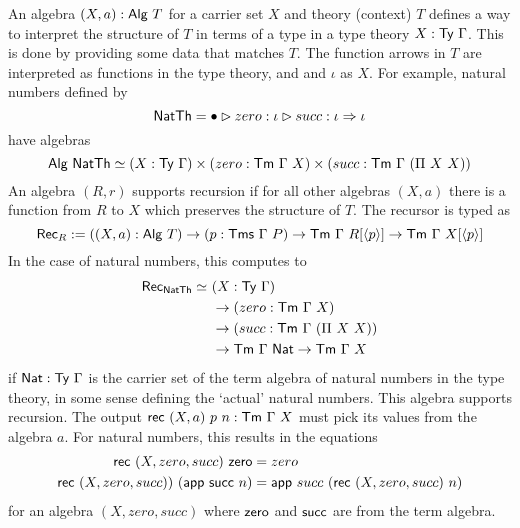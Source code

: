 An algebra $(X, a) : \textsf{Alg}\ T$ for a carrier set $X$ and theory (context)
$T$ defines a way to interpret the structure of $T$ in terms of a type in a type theory
$X : \textsf{Ty}\ \Gamma$. This is done by providing some data that matches $T$. The
function arrows in $T$ are interpreted as functions in the type theory, and
and $\iota$ as $X$. For example, natural numbers defined by
\[
	\textsf{NatTh} = \bullet \rhd zero : \iota \rhd succ:\iota \Rightarrow \iota
\]
have algebras
\[
	\mta{Alg}\ \mta{NatTh}\simeq (X : \Ty\ \Gamma) \times (zero : \Tm\ \Gamma\ X) \times (succ : \Tm\ \Gamma\ (\Pi\ X\ X))
\]
An algebra $(R, r)$ supports recursion if for all other algebras $(X, a)$ there
is a function from $R$ to $X$ which preserves the structure of $T$. The recursor
is typed as
\[
	\mta{Rec}_R := ((X, a) : \mta{Alg}\ T) \to (p : \Tms\ \Gamma\ P) \to \Tm\ \Gamma\ R[\Msub p] \to \Tm\ \Gamma\ X[\Msub p]
\]
In the case of natural numbers, this computes to
\begin{align*}
	\mta{Rec}_{\mta{NatTh}} \simeq\  & (X : \Ty\ \Gamma)                             \\
	                                 & \to (zero : \Tm\ \Gamma\ X)                   \\
	                                 & \to (succ : \Tm\ \Gamma\ (\Pi\ X\ X))         \\
	                                 & \to \Tm\ \Gamma\ \mta{Nat} \to \Tm\ \Gamma\ X
\end{align*}
if $\textsf{Nat} : \textsf{Ty}\ \Gamma$ is the carrier set of the term algebra of
natural numbers in the type theory, in some sense defining the `actual' natural
numbers. This algebra supports recursion. The output $\textsf{rec}\ (X, a)\ p\ n :
	\textsf{Tm}\ \Gamma\ X$ must pick its values from the algebra
$a$. For natural numbers, this results in the equations
\begin{align*}
	\textsf{rec}\ (X, zero, succ)\ \textsf{zero}                  & = zero                                             \\
	\textsf{rec}\ (X, zero, succ))\ (\textsf{app}\ \textsf{succ}\ n) & = \textsf{app}\ succ\ (\textsf{rec}\ (X, zero, succ)\ n)
\end{align*}
for an algebra $(X, zero, succ)$ where $\textsf{zero}$ and $\textsf{succ}$ are from
the term algebra.

